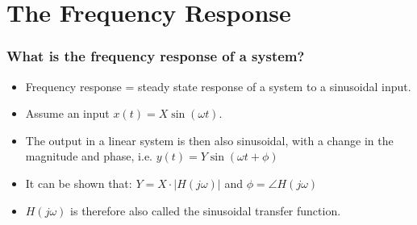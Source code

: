 
\section{The Frequency Response}


%
%
%
%
%
%


\begin{frame}
\frametitle{What is the frequency response of a system?}
\begin{itemize}
\item Frequency response = steady state response of a system to a sinusoidal input.\\
\item Assume an input $x(t) = X\sin(\omega t)$.\\
\item The output in a linear system is then also sinusoidal, with a change in the magnitude and phase, i.e. $y(t) = Y\sin(\omega t + \phi)$\\
\item It can be shown that: $Y = X\cdot |H(j\omega)|$ and $\phi = \angle H(j\omega)$\\
\item $H(j\omega)$ is therefore also called the sinusoidal transfer function. 
\end{itemize}



\end{frame}

